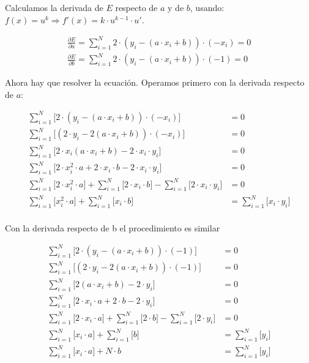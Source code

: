 \documentclass[11pt]{scrartcl}
\begin{document}
Calculamos la derivada de $E$ respecto de $a$ y de $b$, usando: $f(x) = u^k \Longrightarrow f'(x) = k \cdot u^{k-1} \cdot u'$.

\begin{gather*}
\frac{\partial E}{\partial a} = \sum_{i=1}^N 2 \cdot (y_i - (a \cdot x_i + b)) \cdot (- x_i) = 0 \\
\frac{\partial E}{\partial b} = \sum_{i=1}^N 2 \cdot (y_i - (a \cdot x_i + b)) \cdot (- 1) = 0
\end{gather*}

Ahora hay que resolver la ecuación. Operamos primero con la derivada respecto de $a$:

\begin{align*}
\sum_{i=1}^N \Big[ 2 \cdot (y_i - (a \cdot x_i + b)) \cdot (- x_i) \Big] &= 0 \\
\sum_{i=1}^N \Big[(2 \cdot y_i - 2(a \cdot x_i + b)) \cdot (- x_i) \Big] &= 0 \\
\sum_{i=1}^N \Big[ 2 \cdot x_i (a \cdot x_i + b) - 2 \cdot x_i \cdot y_i \Big] &= 0 \\
\sum_{i=1}^N \Big[ 2 \cdot x_i^2 \cdot a + 2 \cdot x_i \cdot b - 2 \cdot x_i \cdot y_i \Big] &= 0 \\
\sum_{i=1}^N \Big[ 2 \cdot x_i^2 \cdot a \Big] + \sum_{i=1}^N \Big[ 2 \cdot x_i \cdot b \Big] - \sum_{i=1}^N \Big[ 2 \cdot x_i \cdot y_i \Big] &= 0 \\
\sum_{i=1}^N \Big[ x_i^2 \cdot a \Big] + \sum_{i=1}^N \Big[ x_i \cdot b \Big] &= \sum_{i=1}^N \Big[ x_i \cdot y_i \Big] \\
\end{align*}

Con la derivada respecto de b el procedimiento es similar

\begin{align*}
\sum_{i=1}^N \Big[ 2 \cdot (y_i - (a \cdot x_i + b)) \cdot (- 1) \Big] &= 0 \\
\sum_{i=1}^N \Big[(2 \cdot y_i - 2(a \cdot x_i + b)) \cdot (- 1) \Big] &= 0 \\
\sum_{i=1}^N \Big[ 2 (a \cdot x_i + b) - 2 \cdot y_i \Big] &= 0 \\
\sum_{i=1}^N \Big[ 2 \cdot x_i \cdot a + 2 \cdot b - 2 \cdot y_i \Big] &= 0 \\
\sum_{i=1}^N \Big[ 2 \cdot x_i \cdot a \Big] + \sum_{i=1}^N \Big[ 2 \cdot b \Big] - \sum_{i=1}^N \Big[ 2 \cdot y_i \Big] &= 0 \\
\sum_{i=1}^N \Big[ x_i \cdot a \Big] + \sum_{i=1}^N \Big[ b \Big] &= \sum_{i=1}^N \Big[ y_i \Big] \\
\sum_{i=1}^N \Big[ x_i \cdot a \Big] + N \cdot b &= \sum_{i=1}^N \Big[ y_i \Big] \\
\end{align*}
\end{document}
